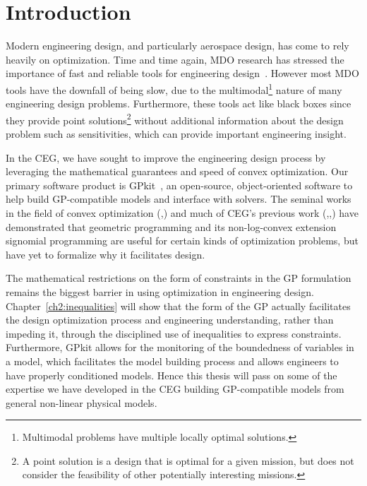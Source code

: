 \chapter{Introduction}
\label{ch1_intro}

Modern engineering design, and particularly aerospace design, has come to rely
heavily on optimization. Time and time again, \gls{MDO} research has stressed
the importance of fast and
reliable tools for engineering design~\cite{martins_mdo}.
However most \gls{MDO} tools
have the downfall of being slow, due to the multimodal\footnote{Multimodal problems have multiple
locally optimal solutions.} nature of many
engineering design problems. Furthermore, these tools act like black boxes since
they provide point solutions\footnote{A point solution is a design that
is optimal for a given mission, but does not consider the
feasibility of other potentially interesting missions.}
without additional information about the design problem
such as sensitivities, which can provide important engineering insight.


In the \gls{CEG}, we have sought to improve the engineering design process by
leveraging the mathematical guarantees and speed of convex optimization.
Our primary software product is GPkit~\cite{gpkit}, an
open-source, object-oriented software to help build \gls{GP}-compatible models and
interface with solvers. The seminal works
in the field of convex optimization (\cite{duffingp},\cite{gpintro}) and much of \gls{CEG}'s previous work
(\cite{gp_ac_design},\cite{sp_ac_design},\cite{sp_engine}) have demonstrated that
geometric programming and its non-log-convex extension signomial programming
are useful for certain kinds of
optimization problems, but have yet to formalize why it
facilitates design.

The mathematical restrictions on the form of constraints in the \gls{GP} formulation
remains the biggest
barrier in using optimization in engineering design. Chapter~\ref{ch2:inequalities} will
show that the form of the \gls{GP} actually facilitates the design
optimization process
and engineering understanding, rather than impeding it, through the disciplined use
of inequalities to express constraints.
Furthermore, GPkit allows for the
monitoring of the boundedness of variables in a model, which facilitates the model
building process and allows engineers
to have properly conditioned models. Hence this thesis will
pass on some of the expertise we have developed in the \gls{CEG} building
\gls{GP}-compatible models from general non-linear physical models.

